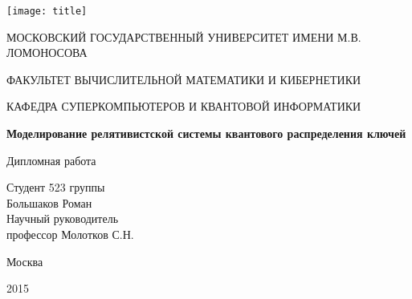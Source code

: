 
\begin{titlepage}
  \centerline{\texttt{[image: title]}}
  \centerline{МОСКОВСКИЙ ГОСУДАРСТВЕННЫЙ УНИВЕРСИТЕТ ИМЕНИ М.В. ЛОМОНОСОВА}
  \centerline{ФАКУЛЬТЕТ ВЫЧИСЛИТЕЛЬНОЙ МАТЕМАТИКИ И КИБЕРНЕТИКИ}
  \centerline{КАФЕДРА СУПЕРКОМПЬЮТЕРОВ И КВАНТОВОЙ ИНФОРМАТИКИ}
  \centerline{\hfill\hrulefill\hrulefill\hfill}
  \vfill
  \vfill
  \vfill
  \large
  \vfill
  \Large
  \begin{center}
  {\bf{Моделирование релятивистской системы квантового распределения ключей}}
  \end{center}
  \normalsize
  \vfill
  \vfill
  \centerline{Дипломная работа}
  \vfill
  \vfill
  \begin{flushright}
  Студент 523 группы\\
  Большаков Роман\\
   \vfill
   \vfill
  Научный руководитель\\
  профессор Молотков С.Н.
  \end{flushright}
  \vfill
  \vfill
  \centerline{Москва}
  \centerline{2015}
  \end{titlepage}

